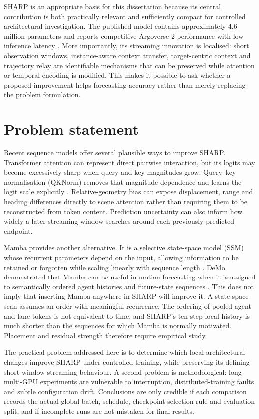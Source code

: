 SHARP is an appropriate basis for this dissertation because its central contribution is both practically relevant and sufficiently compact for controlled architectural investigation. The published model contains approximately 4.6 million parameters and reports competitive Argoverse 2 performance with low inference latency \cite{prutsch2026sharp}. More importantly, its streaming innovation is localised: short observation windows, instance-aware context transfer, target-centric context and trajectory relay are identifiable mechanisms that can be preserved while attention or temporal encoding is modified. This makes it possible to ask whether a proposed improvement helps forecasting accuracy rather than merely replacing the problem formulation.

\section{Problem statement}

Recent sequence models offer several plausible ways to improve SHARP. Transformer attention can represent direct pairwise interaction, but its logits may become excessively sharp when query and key magnitudes grow. Query--key normalisation (QKNorm) removes that magnitude dependence and learns the logit scale explicitly \cite{henry2020qknorm}. Relative-geometry bias can expose displacement, range and heading differences directly to scene attention rather than requiring them to be reconstructed from token content. Prediction uncertainty can also inform how widely a later streaming window searches around each previously predicted endpoint.

Mamba provides another alternative. It is a selective state-space model (SSM) whose recurrent parameters depend on the input, allowing information to be retained or forgotten while scaling linearly with sequence length \cite{gu2024mamba}. DeMo demonstrated that Mamba can be useful in motion forecasting when it is assigned to semantically ordered agent histories and future-state sequences \cite{zhang2024demo}. This does not imply that inserting Mamba anywhere in SHARP will improve it. A state-space scan assumes an order with meaningful recurrence. The ordering of pooled agent and lane tokens is not equivalent to time, and SHARP's ten-step local history is much shorter than the sequences for which Mamba is normally motivated. Placement and residual strength therefore require empirical study.

The practical problem addressed here is to determine which local architectural changes improve SHARP under controlled training, while preserving its defining short-window streaming behaviour. A second problem is methodological: long multi-GPU experiments are vulnerable to interruption, distributed-training faults and subtle configuration drift. Conclusions are only credible if each comparison records the actual global batch, schedule, checkpoint-selection rule and evaluation split, and if incomplete runs are not mistaken for final results.


